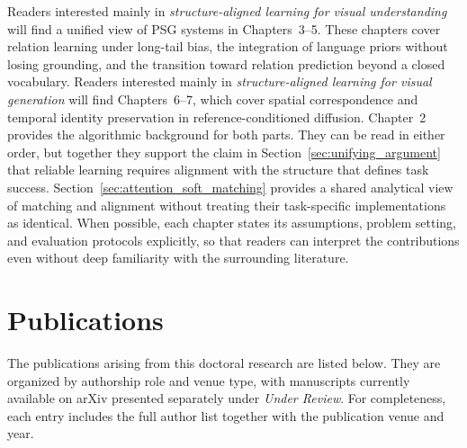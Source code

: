 Readers interested mainly in \emph{structure-aligned learning for visual understanding} will find a unified view of PSG systems in Chapters~3--5. These chapters cover relation learning under long-tail bias, the integration of language priors without losing grounding, and the transition toward relation prediction beyond a closed vocabulary. Readers interested mainly in \emph{structure-aligned learning for visual generation} will find Chapters~6--7, which cover spatial correspondence and temporal identity preservation in reference-conditioned diffusion. Chapter~2 provides the algorithmic background for both parts. They can be read in either order, but together they support the claim in Section~\ref{sec:unifying_argument} that reliable learning requires alignment with the structure that defines task success. Section~\ref{sec:attention_soft_matching} provides a shared analytical view of matching and alignment without treating their task-specific implementations as identical.
When possible, each chapter states its assumptions, problem setting, and evaluation protocols explicitly, so that readers can interpret the contributions even without deep familiarity with the surrounding literature.

\section{Publications}
\label{sec:publications}
\noindent The publications arising from this doctoral research are listed below. They are organized by authorship role and venue type, with manuscripts currently available on arXiv presented separately under \emph{Under Review}. For completeness, each entry includes the full author list together with the publication venue and year.


